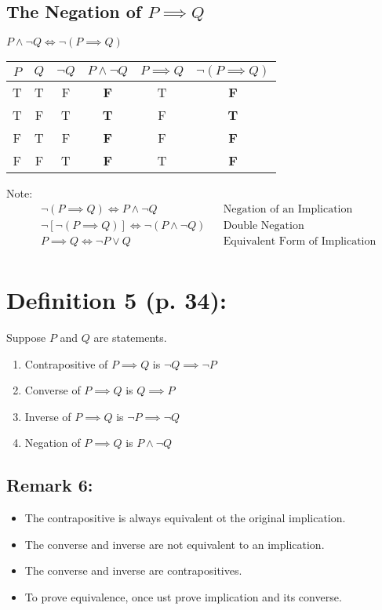 \documentclass{article}
\begin{document}
\subsection{The Negation of $P \implies Q$}
$P \wedge \neg Q \iff \neg(P \implies Q)$

\begin{center}
	\begin{tabular}{|| c | c | c | c | c | c ||}
	\hline\hline
	$P$ & $Q$ & $\neg Q$ & $P \wedge \neg Q$ & $P \implies Q$ & $\neg (P \implies Q)$ \\ [0.5ex]
	\hline\hline
	T & T & F & \textbf{F} & T & \textbf{F}\\
	T & F & T & \textbf{T} & F & \textbf{T}\\
	F & T & F & \textbf{F} & F & \textbf{F}\\
	F & F & T & \textbf{F} & T & \textbf{F}\\
	\hline\hline
	\end{tabular}
\end{center}

Note:
\begin{align*}
	& \neg(P \implies Q) \iff P \wedge \neg Q && \text{Negation of an Implication}\\
	& \neg[\neg(P \implies Q)] \iff \neg(P \wedge \neg Q) && \text{Double Negation}\\
	& P \implies Q \iff \neg P \vee Q && \text{Equivalent Form of Implication}\\
\end{align*}

\section{Definition 5 (p. 34):}
Suppose $P$ and $Q$ are statements.
\begin{enumerate}
	\item Contrapositive of $P \implies Q$ is $\neg Q \implies \neg P$
	\item Converse of $P \implies Q$ is $Q \implies P$
	\item Inverse of $P \implies Q$ is $\neg P \implies \neg Q$
	\item Negation of $P \implies Q$ is $P \wedge \neg Q$
\end{enumerate}

\subsection{Remark 6:}
\begin{itemize}
	\item The contrapositive is always equivalent ot the original implication.
	\item The converse and inverse are not equivalent to an implication.
	\item The converse and inverse are contrapositives.
	\item To prove equivalence, once ust prove implication and its converse.
\end{itemize}
\end{document}
